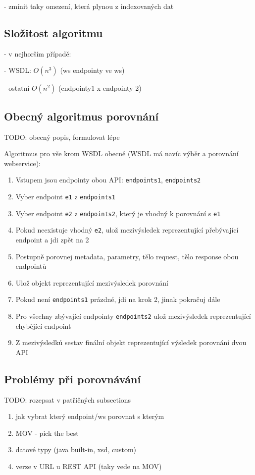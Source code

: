 \documentclass[czech,DP]{thesiskiv}
\begin{document}
- zmínit taky omezení, která plynou z indexovaných dat

\subsection{Složitost algoritmu}

- v nejhorším případě:

	- WSDL: $O(n^3)$ (ws endpointy ve ws)
	
	- ostatní $O(n^2)$ (endpointy1 x endpointy 2)

\subsection{Obecný algoritmus porovnání}

TODO: obecný popis, formulovat lépe

Algoritmus pro vše krom WSDL obecně (WSDL má navíc výběr a porovnání webservice):
\begin{enumerate}
	\item Vstupem jsou endpointy obou API: \verb|endpoints1|, \verb|endpoints2|
	\item Vyber endpoint \verb|e1| z \verb|endpoints1|
	\item Vyber endpoint \verb|e2| z \verb|endpoints2|, který je vhodný k porovnání s \verb|e1|
	\item Pokud neexistuje vhodný \verb|e2|, ulož mezivýsledek reprezentující přebývající endpoint a jdi zpět na 2
	\item Postupně porovnej metadata, parametry, tělo request, tělo response obou endpointů
	\item Ulož objekt reprezentující mezivýsledek porovnání
	\item Pokud není \verb|endpoints1| prázdné, jdi na krok 2, jinak pokračuj dále
	\item Pro všechny zbývající endpointy \verb|endpoints2| ulož mezivýsledek reprezentující chybějící endpoint
	\item Z mezivýsledků sestav finální objekt reprezentující výsledek porovnání dvou API
\end{enumerate}

\subsection{Problémy při porovnávání}	

TODO: rozepsat v patřičných subsections
\begin{enumerate}
	\item jak vybrat který endpoint/ws porovnat s kterým
	\item MOV - pick the best
	\item datové typy (java built-in, xsd, custom)
	\item verze v URL u REST API (taky vede na MOV)
\end{enumerate}
	
\end{document}

